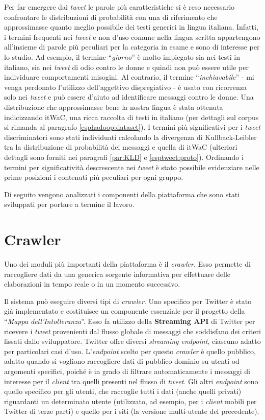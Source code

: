 Per far emergere dai \textit{tweet} le parole più caratteristiche si è reso necessario confrontare le distribuzioni di probabilità con una di riferimento che approssimasse quanto 
meglio possibile dei testi generici in lingua italiana. Infatti, i termini frequenti nei \textit{tweet} e non d’uso comune nella lingua scritta appartengono all’insieme di parole più 
peculiari per la categoria in esame e sono di interesse per lo studio. Ad esempio, il termine ``\textit{giorno}'' è molto impiegato sia nei testi in italiano, sia nei \textit{tweet} di odio contro le donne
e quindi non può essere utile per individuare comportamenti misogini. Al contrario, il termine ``\textit{inchiavabile}'' - mi venga perdonato l'utilizzo dell'aggettivo dispregiativo - 
è usato con ricorrenza solo nei \textit{tweet} e può essere d'aiuto ad identificare messaggi contro le donne. Una distribuzione che approssimasse bene la nostra lingua è 
stata ottenuta indicizzando itWaC, una ricca raccolta di testi in italiano (per dettagli sul corpus
si rimanda al paragrafo \ref{esphadoop:dataset}). I termini più significativi per i \textit{tweet} discriminatori sono stati individuati calcolando la divergenza di Kullback-Leibler 
tra la distribuzione di probabilità dei messaggi e quella di itWaC (ulteriori dettagli sono forniti nei paragrafi \ref{par:KLD} e \ref{esptweet:proto}). Ordinando i termini per 
significatività descrescente nei \textit{tweet} è stato possibile evidenziare nelle prime posizioni i contenuti più peculiari per ogni gruppo.

Di seguito vengono analizzati i componenti della piattaforma che sono stati sviluppati per portare a termine il lavoro.


\section{Crawler}

Uno dei moduli più importanti della piattaforma è il \textit{crawler}. Esso permette di raccogliere dati da una generica sorgente informativa per effettuare delle elaborazioni in tempo reale 
o in un momento successivo.

Il sistema può eseguire diversi tipi di \textit{crawler}. Uno specifico per Twitter è stato già implementato e costituisce un componente essenziale per il progetto della ``\textit{Mappa dell’Intolleranza}''. 
Esso fa utilizzo della \textbf{Streaming API} di Twitter per ricevere i \textit{tweet} provenienti dal flusso globale di messaggi che soddisfano dei criteri fissati dallo sviluppatore. Twitter offre 
diversi \textit{streaming endpoint}, ciascuno adatto per particolari casi d’uso. L’\textit{endpoint} scelto per questo \textit{crawler} è quello pubblico, adatto quando si vogliono raccogliere dati 
di pubblico dominio su utenti od argomenti specifici, poiché è in grado di filtrare automaticamente i messaggi di interesse per il \textit{client} tra quelli presenti nel flusso di \textit{tweet}. 
Gli altri \textit{endpoint} sono quello specifico per gli utenti, che raccoglie tutti i dati (anche quelli privati) riguardanti un determinato utente (utilizzato, ad esempio, per i \textit{client} 
mobili per Twitter di terze parti) e quello per i siti (la versione multi-utente del precedente).

